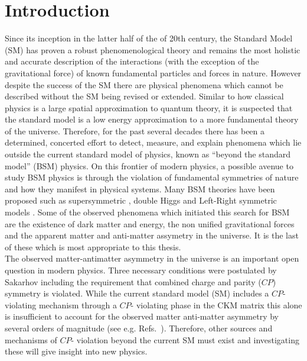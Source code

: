 \documentclass[10pt,a4paper, twoside, openright]{report}
\begin{document}
\chapter{Introduction} \label{chap:P1Intro}
Since its inception in the latter half of the of 20th century, the Standard Model (SM) has proven a robust phenomenological theory and remains the most holistic and accurate description of the interactions (with the exception of  the gravitational force) of known fundamental particles and forces in nature. However despite the success of the SM  there are  physical phenomena which cannot be described without the SM being revised or extended. Similar to how classical physics is a large spatial approximation to quantum theory, it is suspected that the standard model is a low energy approximation to a more fundamental theory of the universe.  Therefore, for the past several decades there has been a determined, concerted effort to detect, measure, and explain phenomena which lie outside the current standard model of physics, known as ``beyond the standard model'' (BSM) physics. On this frontier of modern physics, a possible avenue to study BSM physics is through the violation of fundamental symmetries of nature and how they manifest in physical systems. Many BSM theories have been proposed such as supersymmetric \cite{Fayet1976, Fayet1977, Pospelov2005, Ramsey2008}, double Higgs \cite{Inoue2014} and Left-Right symmetric models \cite{Pati1974}. Some of the observed phenomena which initiated this search for BSM are the existence of dark matter and energy, the non unified gravitational forces and the apparent matter and anti-matter assymetry in the universe. It is the last of these which is most appropriate to this thesis. \\
\linebreak
 The observed matter-antimatter asymmetry in the universe is an important open question in modern physics. Three necessary conditions were postulated by Sakarhov\cite{Sakharov1967} including the requirement that combined charge and parity ($CP$) symmetry  is violated. While the current standard model (SM)  includes a $CP$- violating mechanism through a $CP$- violating phase in the CKM matrix \cite{KM1973} this alone is insufficient to account for the observed matter anti-matter asymmetry by several orders of magnitude (see e.g. Refs.~\cite{Sakharov1967,Farrar1993, Huet1994, Pospelov2005, Canetti2012, FS2010}). Therefore, other sources and mechanisms of $CP$- violation beyond the current SM must exist and investigating these will give insight into new physics. \\ 
\end{document}
